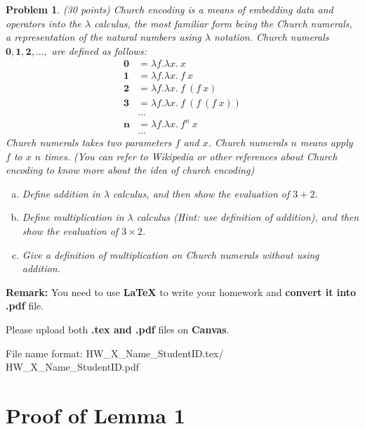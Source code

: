 \documentclass[12pt]{article}
\newtheorem{hw}{Problem}
\begin{document}
\begin{hw}\rm (30 points)
	Church encoding is a means of embedding data and operators into the $\lambda$ calculus, the most familiar form being the Church numerals, a representation of the natural numbers using $\lambda$ notation. 
	Church numerals $\mathbf{0}, \mathbf{1}, \mathbf{2}, ...,$ are defined as follows:
	\begin{align*}
		\mathbf{0} &= \lambda f.\lambda x.\ x \\
		\mathbf{1} &= \lambda f.\lambda x.\ f\ x \\
		\mathbf{2} &= \lambda f.\lambda x.\ f\ (f\ x) \\
		\mathbf{3} &= \lambda f.\lambda x.\ f\ (f\ (f\ x)) \\
		&\dots \\
		\mathbf{n} &= \lambda f.\lambda x.\ f^n\ x \\
		&\dots
	\end{align*}
	Church numerals takes two parameters $f$ and $x$. Church numerals $n$ means apply $f$ to $x$ $n$ times.
	(You can refer to Wikipedia or other references about Church encoding to know more about the idea of church encoding)
	\begin{enumerate}[(a)]
		\item Define addition in $\lambda$ calculus, and then show the evaluation of $3+2$.
		\item Define multiplication in $\lambda$ calculus (Hint: use definition of addition), and then show the evaluation of $3\times2$.
		\item Give a definition of multiplication on Church numerals without using addition.
	\end{enumerate}
	
\end{hw}

\vspace{20pt}

\textbf{Remark:} 
You need to use \textbf{LaTeX} to write your homework and \textbf{convert it into .pdf} file.

Please upload both \textbf{.tex and .pdf} files on \textbf{Canvas}.

File name format: {\color{red} HW\_X\_Name\_StudentID.tex/\color{red} HW\_X\_Name\_StudentID.pdf}

\newpage

\appendix
\renewcommand{\appendixname}{Appendix~\Alph{section}}

\section{Proof of Lemma 1}
\end{document}
